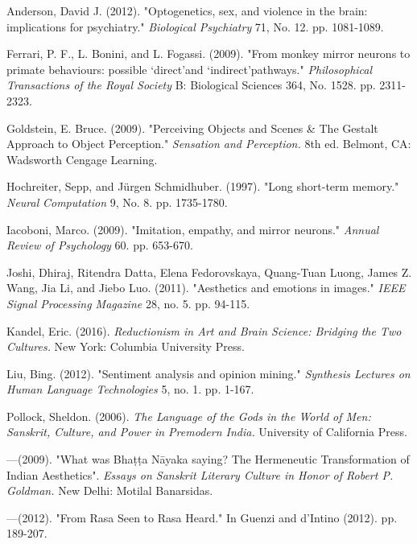 \begin{thebibliography}{99}
\itemsep=2pt
Anderson, David J. (2012). "Optogenetics, sex, and violence in the brain: implications for psychiatry." \textsl{Biological Psychiatry} 71, No. 12. pp. 1081-1089.

Ferrari, P. F., L. Bonini, and L. Fogassi. (2009). "From monkey mirror neurons to primate behaviours: possible ‘direct’and ‘indirect’pathways." \textsl{Philosophical Transactions of the Royal Society} B: Biological Sciences 364, No. 1528. pp. 2311-2323.

Goldstein, E. Bruce. (2009). "Perceiving Objects and Scenes \& The Gestalt Approach to Object Perception." \textsl{Sensation and Perception.} 8th ed. Belmont, CA: Wadsworth Cengage Learning.

Hochreiter, Sepp, and Jürgen Schmidhuber. (1997). "Long short-term memory." \textsl{Neural} \textsl{Computation} 9, No. 8. pp. 1735-1780.

Iacoboni, Marco. (2009). "Imitation, empathy, and mirror neurons." \textsl{Annual Review of Psychology} 60. pp. 653-670.

Joshi, Dhiraj, Ritendra Datta, Elena Fedorovskaya, Quang-Tuan Luong, James Z. Wang, Jia Li, and Jiebo Luo. (2011). "Aesthetics and emotions in images." \textsl{IEEE Signal Processing Magazine} 28, no. 5. pp. 94-115.

Kandel, Eric. (2016). \textsl{Reductionism in Art and Brain Science: Bridging the Two Cultures.} New York: Columbia University Press.

Liu, Bing. (2012). "Sentiment analysis and opinion mining." \textsl{Synthesis Lectures on Human Language Technologies} 5, no. 1. pp. 1-167.

Pollock, Sheldon. (2006). \textsl{The Language of the Gods in the World of Men: Sanskrit, Culture, and Power in Premodern India.} University of California Press.

---\kern3pt(2009). "What was Bhaṭṭa Nāyaka saying? The Hermeneutic Transformation of Indian Aesthetics". \textsl{Essays on Sanskrit Literary Culture in Honor of Robert P. Goldman.} New Delhi: Motilal Banarsidas.

---\kern3pt(2012). "From Rasa Seen to Rasa Heard." In Guenzi and d’Intino (2012). pp. 189-207.


\end{thebibliography}
